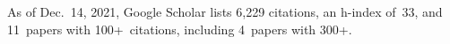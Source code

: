 %
As of Dec.~14, 2021, Google Scholar lists
6,229 citations,
an h-index of~33,
and 11~papers with 100+~citations, including 4~papers with 300+.
